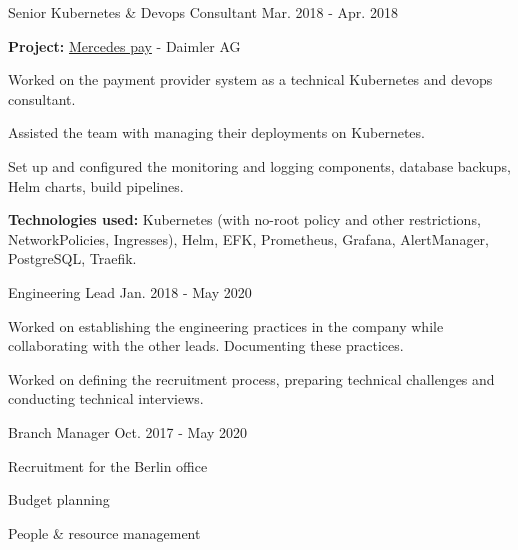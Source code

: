 \begin{cventries}
    \cventry
    {Senior Kubernetes \& Devops Consultant}
    {}
    {}
    {Mar. 2018 - Apr. 2018}
    {
    \begin{cvitems}
        \item {
        \textbf{Project:} \href{https://www.daimler-mobility.com/en/solutions/mobility-ecosystem/portfolio/payment-services/}{Mercedes pay} - Daimler AG
        }
        \newline
        \item {Worked on the payment provider system as a technical Kubernetes and devops consultant.}
        \item {Assisted the team with managing their deployments on Kubernetes.}
        \item {
        Set up and configured the monitoring and logging components, database backups,
        Helm charts, build pipelines.
        }
        \smallskip
        \item {
        \textbf{Technologies used:} Kubernetes (with no-root policy and other restrictions,
        NetworkPolicies, Ingresses), Helm, EFK, Prometheus,
        Grafana, AlertManager, PostgreSQL, Traefik.
        }
    \end{cvitems}
    }

    \cventry
    {Engineering Lead}
    {}
    {}
    {Jan. 2018 - May 2020}
    {
    \begin{cvitems}
        \item {
        Worked on establishing the engineering practices in the company while
        collaborating with the other leads. Documenting these practices.
        }
        \item {
        Worked on defining the recruitment process, preparing technical challenges
        and conducting technical interviews.
        }
    \end{cvitems}
    }

    \cventry
    {Branch Manager}
    {}
    {}
    {Oct. 2017 - May 2020}
    {
    \begin{cvitems}
        \item {Recruitment for the Berlin office}
        \item {Budget planning}
        \item {People \& resource management}
    \end{cvitems}
    }


\end{cventries}

